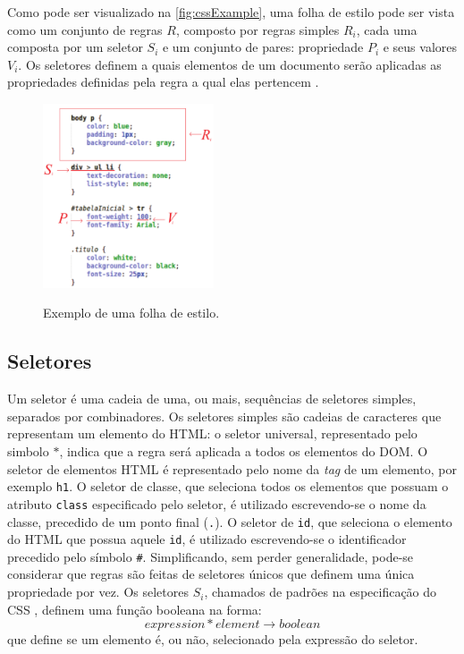 Como pode ser visualizado na \autoref{fig:cssExample}, uma folha de estilo pode ser vista como um conjunto de regras \(R\), composto por regras simples \(R_i\), cada uma composta por um seletor \(S_i\) e um conjunto de pares: propriedade \(P_i\) e seus valores \(V_i\). Os seletores definem a quais elementos de um documento serão aplicadas as propriedades definidas pela regra a qual elas pertencem \cite{Geneves2012}.

\begin{figure}[!htb]
	\centering
	\caption{Exemplo de uma folha de estilo.}
	\includegraphics[width=0.45\textwidth]{./04-figuras/css_example_marked}
	\label{fig:cssExample}
\end{figure}

\subsection{Seletores}
\label{subsec:seletores}

Um seletor é uma cadeia de uma, ou mais, sequências de seletores simples, separados por combinadores. Os seletores simples são cadeias de caracteres que representam um elemento do HTML: o seletor universal, representado pelo simbolo \(\ast\), indica que a regra será aplicada a todos os elementos do DOM. O seletor de elementos HTML é representado pelo nome da \textit{tag} de um elemento, por exemplo \texttt{h1}. O seletor de classe, que seleciona todos os elementos que possuam o atributo \texttt{class} especificado pelo seletor, é utilizado escrevendo-se o nome da classe,  precedido de um ponto final (\texttt{.}). O seletor de \texttt{id}, que seleciona o elemento do HTML que possua aquele \texttt{id}, é utilizado escrevendo-se o identificador precedido pelo símbolo \texttt{\#}. 
Simplificando, sem perder generalidade, pode-se considerar que regras são feitas de seletores únicos que definem uma única propriedade por vez. Os seletores \(S_i\), chamados de padrões na especificação do CSS \cite{CSSspec2009}, definem uma função booleana na forma:
\begin{equation}
	expression * element \rightarrow boolean
\end{equation}
que define se um elemento é, ou não, selecionado pela expressão do seletor.

